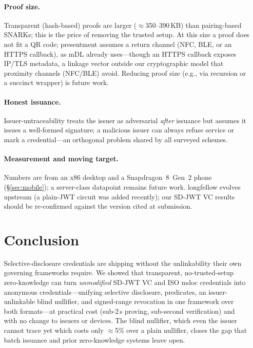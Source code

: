 \documentclass[11pt]{article}
\theoremstyle{plain}
\theoremstyle{definition}
\begin{document}
\paragraph{Proof size.} Transparent (hash-based) proofs are larger
($\approx$350--390\,KB) than pairing-based SNARKs; this is the price of removing the
trusted setup. At this size a proof does not fit a QR code; presentment assumes a
return channel (NFC, BLE, or an HTTPS callback), as mDL already uses---though an HTTPS callback exposes
IP/TLS metadata, a linkage vector outside our cryptographic model that proximity
channels (NFC/BLE) avoid. Reducing proof
size (e.g., via recursion or a succinct wrapper) is future work.
\paragraph{Honest issuance.} Issuer-untraceability treats the issuer as adversarial
\emph{after} issuance but assumes it issues a well-formed signature; a malicious issuer
can always refuse service or mark a credential---an orthogonal problem shared by all
surveyed schemes.
\paragraph{Measurement and moving target.} Numbers are from an x86 desktop and a
Snapdragon~8~Gen~2 phone (\S\ref{sec:mobile}); a server-class datapoint remains future
work. longfellow
evolves upstream (a plain-JWT circuit was added recently); our SD-JWT VC results should
be re-confirmed against the version cited at submission.

\section{Conclusion}\label{sec:conclusion}
Selective-disclosure credentials are shipping without the unlinkability their own
governing frameworks require. We showed that transparent, no-trusted-setup
zero-knowledge can turn \emph{unmodified} SD-JWT VC and ISO mdoc credentials into
anonymous credentials---unifying selective disclosure, predicates, an
issuer-unlinkable blind nullifier, and signed-range revocation in one framework over
both formats---at practical cost (sub-2\,s proving, sub-second verification) and with no
change to issuers or devices. The blind nullifier, which even the issuer cannot trace
yet which costs only $\approx$5\% over a plain nullifier, closes the gap that batch issuance and
prior zero-knowledge systems leave open.
\end{document}
